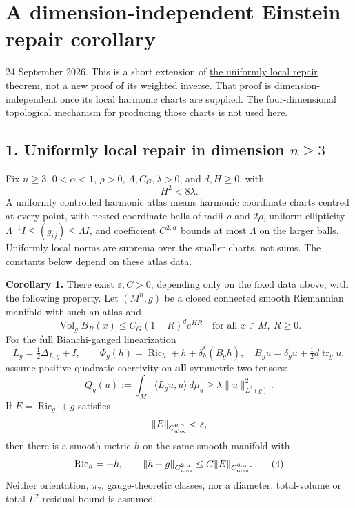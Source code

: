 \documentclass[
  11pt,
]{article}
\author{}
\date{}
\begin{document}
\hypertarget{a-dimension-independent-einstein-repair-corollary}{%
\section{A dimension-independent Einstein repair
corollary}\label{a-dimension-independent-einstein-repair-corollary}}

24 September 2026. This is a short extension of
\href{20260924_uniformly_local_repair.md}{the uniformly local repair
theorem}, not a new proof of its weighted inverse. That proof is
dimension-independent once its local harmonic charts are supplied. The
four-dimensional topological mechanism for producing those charts is not
used here.

\hypertarget{uniformly-local-repair-in-dimension-nge3}{%
\subsection{\texorpdfstring{1. Uniformly local repair in dimension
\(n\ge3\)}{1. Uniformly local repair in dimension n\textbackslash ge3}}\label{uniformly-local-repair-in-dimension-nge3}}

Fix \(n\ge3\), \(0<\alpha<1\), \(\rho>0\), \(\Lambda,C_G,\lambda>0\),
and \(d,H\ge0\), with \[
                              H^2<8\lambda.                 \tag{1}
\] A uniformly controlled harmonic atlas means harmonic coordinate
charts centred at every point, with nested coordinate balls of radii
\(\rho\) and \(2\rho\), uniform ellipticity
\(\Lambda^{-1}I\le(g_{ij})\le\Lambda I\), and coefficient
\(C^{2,\alpha}\) bounds at most \(\Lambda\) on the larger balls.
Uniformly local norms are suprema over the smaller charts, not sums. The
constants below depend on these atlas data.

\textbf{Corollary 1.} There exist \(\varepsilon,C>0\), depending only on
the fixed data above, with the following property. Let \((M^n,g)\) be a
closed connected smooth Riemannian manifold with such an atlas and \[
 \operatorname{Vol}_g B_R(x)\le C_G(1+R)^d e^{HR}
       \quad\text{for all }x\in M,\ R\ge0.                  \tag{2}
\] For the full Bianchi-gauged linearization \[
 L_g=\tfrac12\Delta_{L,g}+I,
 \qquad
 \Phi_g(h)=\operatorname{Ric}_h+h+\delta_h^*(B_gh),
 \quad B_gu=\delta_gu+\tfrac12d\operatorname{tr}_gu,
\] assume positive quadratic coercivity on \textbf{all} symmetric
two-tensors: \[
 Q_g(u):=\int_M\langle L_gu,u\rangle\,d\mu_g
                       \ge\lambda\|u\|_{L^2(g)}^2.          \tag{3}
\] If \(E=\operatorname{Ric}_g+g\) satisfies \[
                   \|E\|_{C^{0,\alpha}_{\rm uloc}}<\varepsilon,
\] then there is a smooth metric \(h\) on the same smooth manifold with
\[
 \operatorname{Ric}_h=-h,
 \qquad
 \|h-g\|_{C^{2,\alpha}_{\rm uloc}}
                   \le C\|E\|_{C^{0,\alpha}_{\rm uloc}}.     \tag{4}
\] Neither orientation, \(\pi_2\), gauge-theoretic classes, nor a
diameter, total-volume or total-\(L^2\)-residual bound is assumed.
\end{document}
